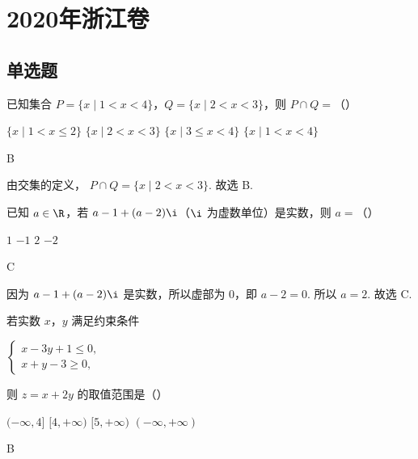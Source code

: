 \chapter{2020年浙江卷}

\section{单选题}

\begin{problem}
已知集合 \(P=\{x\mid 1<x<4\}\)，\(Q=\{x\mid 2<x<3\}\)，则 \(P\cap Q=\)（\quad）

\choices
    {\(\{x\mid 1<x\le 2\}\)}
    {\(\{x\mid 2<x<3\}\)}
    {\(\{x\mid 3\le x<4\}\)}
    {\(\{x\mid 1<x<4\}\)}
\end{problem}

\begin{answer}
B
\end{answer}

\begin{solution}
由交集的定义，
\(P\cap Q=\{x\mid 2<x<3\}\).
故选 B.
\end{solution}

\begin{problem}
已知 \(a\in\R\)，若 \(a-1+(a-2)\i\)（\(\i\) 为虚数单位）是实数，则 \(a=\)（\quad）

\choices
    {\(1\)}
    {\(-1\)}
    {\(2\)}
    {\(-2\)}
\end{problem}

\begin{answer}
C
\end{answer}

\begin{solution}
因为 \(a-1+(a-2)\i\) 是实数，所以虚部为 0，即
\(a-2=0\).
所以 \(a=2\). 故选 C.
\end{solution}

\begin{problem}
若实数 \(x\)，\(y\) 满足约束条件

\(\begin{cases}
x-3y+1\le0,\\
x+y-3\ge0,
\end{cases}\)

则 \(z=x+2y\) 的取值范围是（\quad）

\choices
    {\((-\infty,4]\)}
    {\([4,+\infty)\)}
    {\([5,+\infty)\)}
    {\((-\infty,+\infty)\)}
\end{problem}

\begin{answer}
B
\end{answer}

